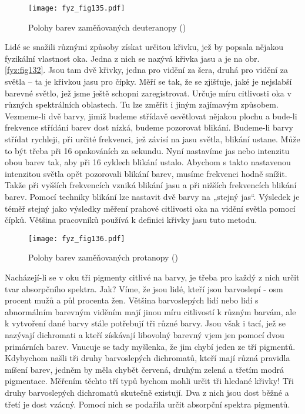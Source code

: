 {    \begin{figure}[ht!]   %
      \centering
      \texttt{[image: fyz\_fig135.pdf]}
      \caption{Polohy barev zaměňovaných deuteranopy
              (\cite[s.~476]{Feynman01})}
      \label{fyz:fig135}
    \end{figure}
    Lidé se snažili různými způsoby získat určitou křivku, jež by popsala 
    nějakou fyzikální vlastnost oka. Jedna z nich se nazývá křivka jasu a je na obr. 
    \ref{fyz:fig132}. Jsou tam dvě křivky, jedna pro vidění za šera, druhá pro vidění za světla – 
    ta je křivkou jasu pro čípky. Měří se tak, že se zjišťuje, jaké je nejslabší barevné světlo, 
    jež jsme ještě schopni zaregistrovat. Určuje míru citlivosti oka v různých spektrálních 
    oblastech. Tu lze změřit i jiným zajímavým způsobem. Vezmeme-li dvě barvy, jimiž budeme 
    střídavě osvětlovat nějakou plochu a bude-li frekvence střídání barev dost nízká, budeme 
    pozorovat blikání. Budeme-li barvy střídat rychleji, při určité frekvenci, jež závisí na jasu 
    světla, blikání ustane. Může to být třeba při \num{16} opakováních za sekundu. Nyní nastavíme 
    jas nebo intenzitu obou barev tak, aby při \num{16} cyklech blikání ustalo. Abychom s takto 
    nastavenou intenzitou světla opět pozorovali blikání barev, musíme frekvenci hodně snížit. 
    Takže při vyšších frekvencích vzniká blikání jasu a při nižších frekvencích blikání barev. 
    Pomocí techniky blikání lze nastavit dvě barvy na „stejný jas“. Výsledek je téměř stejný jako 
    výsledky měření prahové citlivosti oka na vidění světla pomocí čípků. Většina pracovníků 
    používá k definici křivky jasu tuto metodu.

    \begin{figure}[ht!]  %
      \centering
      \texttt{[image: fyz\_fig136.pdf]}
      \caption{Polohy barev zaměňovaných protanopy
              (\cite[s.~477]{Feynman01})}
      \label{fyz:fig136}
    \end{figure}
    Nacházejí-li se v oku tři pigmenty citlivé na barvy, je třeba pro každý z nich určit tvar 
    absorpčního spektra. Jak? Víme, že jsou lidé, kteří jsou barvoslepí - osm procent mužů a půl 
    procenta žen. Většina barvoslepých lidí nebo lidí s abnormálním barevným viděním mají jinou 
    míru citlivostí k různým barvám, ale k vytvoření dané barvy stále potřebují tři různé barvy. 
    Jsou však i tací, jež se nazývají dichromati a kteří získávají libovolný barevný vjem jen 
    pomocí dvou primárních barev. Vnucuje se tady myšlenka, že jim chybí jeden ze tří pigmentů. 
    Kdybychom našli tři druhy barvoslepých dichromatů, kteří mají různá pravidla míšení barev, 
    jedněm by měla chybět červená, druhým zelená a třetím modrá pigmentace. Měřením těchto tří typů 
    bychom mohli určit tři hledané křivky! Tři druhy barvoslepých dichromatů skutečně existují. Dva 
    z nich jsou dost běžné a třetí je dost vzácný. Pomocí nich se podařila určit absorpční spektra 
    pigmentů.

}

